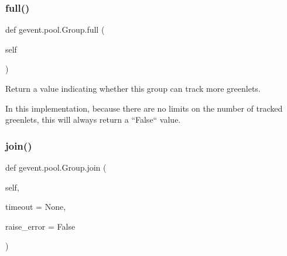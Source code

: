 \subsubsection{\texorpdfstring{full()}{full()}}
{\footnotesize\ttfamily def gevent.\+pool.\+Group.\+full (\begin{DoxyParamCaption}\item[{}]{self }\end{DoxyParamCaption})}

\begin{DoxyVerb}Return a value indicating whether this group can track more greenlets.

In this implementation, because there are no limits on the number of
tracked greenlets, this will always return a ``False`` value.
\end{DoxyVerb}
 \mbox{\label{classgevent_1_1pool_1_1_group_ad368620ebda7dee3d34b0d62ffbc9dfd}} 
\subsubsection{\texorpdfstring{join()}{join()}}
{\footnotesize\ttfamily def gevent.\+pool.\+Group.\+join (\begin{DoxyParamCaption}\item[{}]{self,  }\item[{}]{timeout = {\ttfamily None},  }\item[{}]{raise\+\_\+error = {\ttfamily False} }\end{DoxyParamCaption})}

